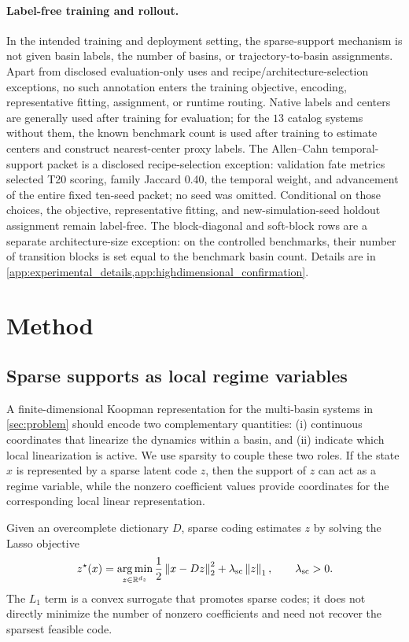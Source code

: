 \documentclass[11pt]{article}
\newcommand{\R}{\mathbb{R}}
\newcommand{\argmin}{\operatorname*{arg\,min}}
\newcommand{\norm}[1]{\left\lVert #1 \right\rVert}
\begin{document}
\paragraph{Label-free training and rollout.} In the intended training and deployment setting, the sparse-support mechanism is not given basin labels, the number of basins, or trajectory-to-basin assignments. Apart from disclosed evaluation-only uses and recipe/architecture-selection exceptions, no such annotation enters the training objective, encoding, representative fitting, assignment, or runtime routing. Native labels and centers are generally used after training for evaluation; for the \(13\) catalog systems without them, the known benchmark count is used after training to estimate centers and construct nearest-center proxy labels. The Allen--Cahn temporal-support packet is a disclosed recipe-selection exception: validation fate metrics selected T20 scoring, family Jaccard 0.40, the temporal weight, and advancement of the entire fixed ten-seed packet; no seed was omitted. Conditional on those choices, the objective, representative fitting, and new-simulation-seed holdout assignment remain label-free. The block-diagonal and soft-block rows are a separate architecture-size exception: on the controlled benchmarks, their number of transition blocks is set equal to the benchmark basin count. Details are in \cref{app:experimental_details,app:highdimensional_confirmation}.

\section{Method}
\label{sec:method}
\subsection{Sparse supports as local regime variables}
\label{sec:method_regime_supports}


A finite-dimensional Koopman representation for the multi-basin systems in \cref{sec:problem} should encode two complementary quantities: (i) continuous coordinates that linearize the dynamics within a basin, and (ii) indicate which local linearization is active. We use sparsity to couple these two roles. If the state \(x\) is represented by a sparse latent code \(z\), then the support of \(z\) can act as a regime variable, while the nonzero coefficient values provide coordinates for the corresponding local linear representation.

Given an overcomplete dictionary \(D\), sparse coding estimates \(z\) by solving the Lasso objective \citep{beck2009fast}
\begin{equation}
  z^\star(x)
  =
  \argmin_{z\in\R^{d_z}}
  \frac{1}{2}\norm{x-Dz}_2^2+\lambda_{\rm sc}\norm{z}_1,
  \qquad \lambda_{\rm sc}>0.
  \label{eq:sparse_coding_objective}
\end{equation}
The \(L_1\) term is a convex surrogate that promotes sparse codes; it does not directly minimize the number of nonzero coefficients and need not recover the sparsest feasible code.
\end{document}
